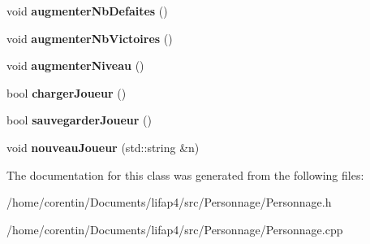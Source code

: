 \begin{DoxyCompactItemize}
\item 
\mbox{\label{class_joueur_a2eeebb62c0f67eabb58a4d62280675c7}} 
void {\bfseries augmenter\+Nb\+Defaites} ()
\item 
\mbox{\label{class_joueur_a30e0e5b06537c5a7d5853230b1da9509}} 
void {\bfseries augmenter\+Nb\+Victoires} ()
\item 
\mbox{\label{class_joueur_afce34539fafa99280cf5976c36c1ea12}} 
void {\bfseries augmenter\+Niveau} ()
\item 
\mbox{\label{class_joueur_a2bf2a581a2e4de27a812e21b360ab9f3}} 
bool {\bfseries charger\+Joueur} ()
\item 
\mbox{\label{class_joueur_aa90fea1c7f8ea2b76d729df52d444027}} 
bool {\bfseries sauvegarder\+Joueur} ()
\item 
\mbox{\label{class_joueur_aaf7e86d801aed3c3e531806c3ed50a89}} 
void {\bfseries nouveau\+Joueur} (std\+::string \&n)
\end{DoxyCompactItemize}


The documentation for this class was generated from the following files\+:\begin{DoxyCompactItemize}
\item 
/home/corentin/\+Documents/lifap4/src/\+Personnage/Personnage.\+h\item 
/home/corentin/\+Documents/lifap4/src/\+Personnage/Personnage.\+cpp\end{DoxyCompactItemize}
